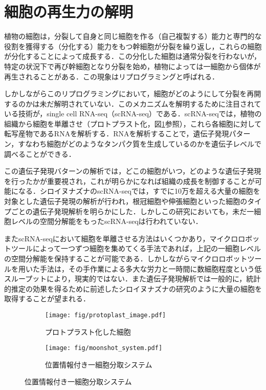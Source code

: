 \thispagestyle{fancy2}

\section{細胞の再生力の解明}
\label{sec:regeneration}

植物の細胞は，分裂して自身と同じ細胞を作る（自己複製する）能力と専門的な役割を獲得する（分化する）能力をもつ幹細胞が分裂を繰り返し，これらの細胞が分化することによって成長する\cite{sakamoto2022transcriptional}．この分化した細胞は通常分裂を行わないが，特定の状況下で再び幹細胞となり分裂を始め，植物によっては一細胞から個体が再生されることがある．この現象はリプログラミングと呼ばれる．

しかしながらこのリプログラミングにおいて，細胞がどのようにして分裂を再開するのかは未だ解明されていない．このメカニズムを解明するために注目されている技術が，single cell RNA-seq（scRNA-seq）\cite{kolodziejczyk2015technology}である．scRNA-seqでは，植物の組織から細胞を単離させ（プロトプラスト化\cite{pasternak2020single}，図\ref{fig:protoplast}参照），これら各細胞に対して転写産物であるRNAを解析する．RNAを解析することで，遺伝子発現パターン，すなわち細胞がどのようなタンパク質を生成しているのかを遺伝子レベルで調べることができる\cite{xiao2012transcriptome,sakamoto2022transcriptional}．

この遺伝子発現バターンの解析では，どこの細胞がいつ，どのような遺伝子発現を行ったかが重要視され，これが明らかになれば組織の成長を制御することが可能になる．シロイヌナズナのscRNA-seq\cite{shahan2022single}では，すでに10万を超える大量の細胞を対象とした遺伝子発現の解析が行われ，根冠細胞や伸張細胞といった細胞のタイプごとの遺伝子発現解析を明らかにした．しかしこの研究においても，未だ一細胞レベルの空間分解能をもったscRNA-seqは行われていない．

またscRNA-seqにおいて細胞を単離させる方法はいくつかあり\cite{kolodziejczyk2015technology}，マイクロロボットツールによって一つずつ細胞を集めてくる手法であれば，上記の一細胞レベルの空間分解能を保持することが可能である．しかしながらマイクロロボットツールを用いた手法は，その手作業による多大な労力と一時間に数細胞程度という低スループットにより，現実的ではない．また遺伝子発現解析では一般的に，統計的推定の効果を得るために前述したシロイヌナズナの研究のように大量の細胞を取得することが望まれる．

\begin{figure}[t]
    \centering
    \begin{subfigure}[t]{0.27\linewidth}
        \centering
        \texttt{[image: fig/protoplast\_image.pdf]}
        \caption[プロトプラスト化した細胞]{プロトプラスト化した細胞}
        \label{fig:protoplast}
    \end{subfigure}
    \hfill
    \begin{subfigure}[t]{0.67\linewidth}
        \centering
        \texttt{[image: fig/moonshot\_system.pdf]}
        \caption[位置情報付き一細胞分取システム]{位置情報付き一細胞分取システム}
        \label{fig:moonshot_system}
    \end{subfigure}
\end{figure}

